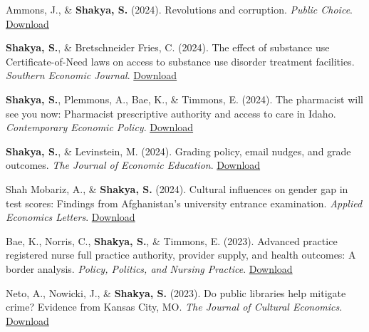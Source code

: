 \begin{etaremune}
\item Ammons, J., \& \textbf{Shakya, S.} (2024). Revolutions and corruption. \textit{Public Choice}. \hfill \href{https://link.springer.com/article/10.1007/s11127-024-01173-1}{Download}

\item \textbf{Shakya, S.}, \& Bretschneider Fries, C. (2024). The effect of substance use Certificate-of-Need laws on access to substance use disorder treatment facilities. \textit{Southern Economic Journal}. \hfill \href{https://www.dropbox.com/scl/fi/fkhpvcf0ico3xjxjcs66b/Southern-Economic-Journal-2024-Shakya-The-effect-of-substance-use-Certificate-of-Need-laws-on-access-to-substance-use.pdf?rlkey=lapu9zmq0x9gwe362ttpeailb&dl=0}{Download}

\item \textbf{Shakya, S.}, Plemmons, A., Bae, K., \& Timmons, E. (2024). The pharmacist will see you now: Pharmacist prescriptive authority and access to care in Idaho. \textit{Contemporary Economic Policy}. \hfill \href{https://onlinelibrary.wiley.com/doi/full/10.1111/coep.12647}{Download}

\item \textbf{Shakya, S.}, \& Levinstein, M. (2024). Grading policy, email nudges, and grade outcomes. \textit{The Journal of Economic Education}. \hfill \href{https://www.dropbox.com/scl/fi/o9seuixtlkn74xdnzljcw/Grading-policy-email-nudges-and-grade-outcomes.pdf?rlkey=i1k0jzv8h55txa5625x35ik1g&dl=0}{Download}

\item Shah Mobariz, A., \& \textbf{Shakya, S.} (2024). Cultural influences on gender gap in test scores: Findings from Afghanistan's university entrance examination. \textit{Applied Economics Letters}. \hfill \href{https://www.tandfonline.com/doi/pdf/10.1080/13504851.2024.2332523}{Download}

\item Bae, K., Norris, C., \textbf{Shakya, S.}, \& Timmons, E. (2023). Advanced practice registered nurse full practice authority, provider supply, and health outcomes: A border analysis. \textit{Policy, Politics, and Nursing Practice}. \hfill \href{https://www.dropbox.com/scl/fi/4vw2vcl9v5ckwrmnjloxk/Advanced-Practice-Registered-Nurse-Full-Practice-Authority-Border-Analysis.pdf?rlkey=c11r6bonquwwn2elijdnxjtgb&dl=0}{Download}

\item Neto, A., Nowicki, J., \& \textbf{Shakya, S.} (2023). Do public libraries help mitigate crime? Evidence from Kansas City, MO. \textit{The Journal of Cultural Economics}. \hfill \href{https://www.dropbox.com/scl/fi/17fe6rp5xi12xcgkkq34i/Do-Public-Libraries.pdf?rlkey=kg5bzwtp370i2n77gcdhrxorq&dl=0}{Download}


\end{etaremune}
